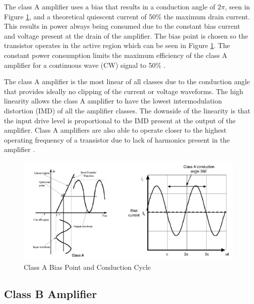 The class A amplifier uses a bias that results in a conduction angle of $2\pi$, seen in Figure \ref{classa_bias}, and a theoretical quiescent current of 50\% the maximum drain current. This results in power always being consumed due to the constant bias current and voltage present at the drain of the amplifier. The bias point is chosen so the transistor operates in the active region which can be seen in Figure \ref{classa_bias}. The constant power consumption limits the maximum efficiency of the class A amplifier for a continuous wave (CW) signal to 50\% \cite{C.Cripps2006}.


The class A amplifier is the most linear of all classes due to the conduction angle that provides ideally no clipping of the current or voltage waveforms. The high linearity allows the class A amplifier to have the lowest intermodulation distortion (IMD) of all the amplifier classes. The downside of the linearity is that the input drive level is proportional to the IMD present at the output of the amplifier. Class A amplifiers are also able to operate closer to the highest operating frequency of a transistor due to lack of harmonics present in the amplifier \cite{Rosu2001}. %


\begin{figure}
  \centering
  \includegraphics[width=6in]{figures/classes/classa}
  \caption{Class A Bias Point and Conduction Cycle \cite{Rosu2001}}\label{classa_bias}
\end{figure}

\subsection{Class B Amplifier}

